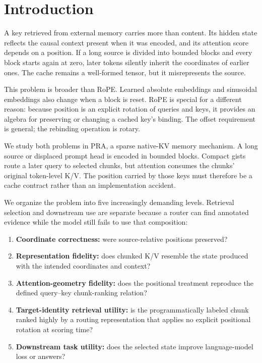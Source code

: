 \documentclass[11pt]{article}
\begin{document}
\section{Introduction}

A key retrieved from external memory carries more than content. Its hidden state reflects
the causal context present when it was encoded, and its attention score depends on a
position. If a long source is divided into bounded blocks and every block starts again at
zero, later tokens silently inherit the coordinates of earlier ones. The cache remains a
well-formed tensor, but it misrepresents the source.

This problem is broader than RoPE. Learned absolute embeddings and sinusoidal embeddings
also change when a block is reset. RoPE is special for a different reason: because position
is an explicit rotation of queries and keys, it provides an algebra for preserving or
changing a cached key's binding. The offset requirement is general; the rebinding operation
is rotary.

We study both problems in PRA, a sparse native-KV memory mechanism. A long source or displaced
prompt head is encoded in bounded blocks. Compact gists route a later query to selected
chunks, but attention consumes the chunks' original token-level K/V. The position carried by
those keys must therefore be a cache contract rather than an implementation accident.

We organize the problem into five increasingly demanding levels. Retrieval selection and
downstream use are separate because a router can find annotated evidence while the model still
fails to use that composition:
\begin{enumerate}[leftmargin=*]
\item \textbf{Coordinate correctness:} were source-relative positions preserved?
\item \textbf{Representation fidelity:} does chunked K/V resemble the state produced with
the intended coordinates and context?
\item \textbf{Attention-geometry fidelity:} does the positional treatment reproduce the
defined query--key chunk-ranking relation?
\item \textbf{Target-identity retrieval utility:} is the programmatically labeled chunk ranked
highly by a routing representation that applies no explicit positional rotation at scoring time?
\item \textbf{Downstream task utility:} does the selected state improve language-model loss
or answers?
\end{enumerate}
\end{document}

